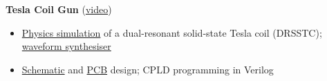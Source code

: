 \documentclass[11pt,a4paper]{article}
\newcommand{\doc}[2]{\href{https://neuroai-research.github.io/Ricky/#1}{#2}}
\begin{document}
\textbf{Tesla Coil Gun} (\href{https://www.youtube.com/watch?v=l_bg02wG8IY}{video})
\begin{itemize}
  \item \href{https://github.com/TeslaCoilResearch/tesla-coil-simulator}{Physics simulation}
        of a dual-resonant solid-state Tesla coil (DRSSTC);
        \doc{TC_Music_App.png}{waveform synthesiser}
  \item \doc{2023-12-16_TC_Gun_driver.pdf}{Schematic} and
        \doc{2023-12-16_driver_PCB_3D.png}{PCB} design;
        CPLD programming in Verilog
\end{itemize}
\end{document}
